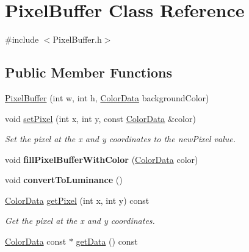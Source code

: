 \hypertarget{classPixelBuffer}{}\section{Pixel\+Buffer Class Reference}
\label{classPixelBuffer}


{\ttfamily \#include $<$Pixel\+Buffer.\+h$>$}

\subsection*{Public Member Functions}
\begin{DoxyCompactItemize}
\item 
\hyperlink{classPixelBuffer_ae373904fcdd3c820677b959354b75410}{Pixel\+Buffer} (int w, int h, \hyperlink{classColorData}{Color\+Data} background\+Color)
\item 
void \hyperlink{classPixelBuffer_abe673364dfceec95783e1dfb00ec9bd1}{set\+Pixel} (int x, int y, const \hyperlink{classColorData}{Color\+Data} \&color)\hypertarget{classPixelBuffer_abe673364dfceec95783e1dfb00ec9bd1}{}\label{classPixelBuffer_abe673364dfceec95783e1dfb00ec9bd1}

\begin{DoxyCompactList}\small\item\em Set the pixel at the x and y coordinates to the new\+Pixel value. \end{DoxyCompactList}\item 
void {\bfseries fill\+Pixel\+Buffer\+With\+Color} (\hyperlink{classColorData}{Color\+Data} color)\hypertarget{classPixelBuffer_a1bdab74553ab7d569629a42a808b4785}{}\label{classPixelBuffer_a1bdab74553ab7d569629a42a808b4785}

\item 
void {\bfseries convert\+To\+Luminance} ()\hypertarget{classPixelBuffer_a73f0518c147ad7900a64b4ffa205b9fc}{}\label{classPixelBuffer_a73f0518c147ad7900a64b4ffa205b9fc}

\item 
\hyperlink{classColorData}{Color\+Data} \hyperlink{classPixelBuffer_ae01450fb4e9824c1e93e92f4377e9924}{get\+Pixel} (int x, int y) const \hypertarget{classPixelBuffer_ae01450fb4e9824c1e93e92f4377e9924}{}\label{classPixelBuffer_ae01450fb4e9824c1e93e92f4377e9924}

\begin{DoxyCompactList}\small\item\em Get the pixel at the x and y coordinates. \end{DoxyCompactList}\item 
\hyperlink{classColorData}{Color\+Data} const $\ast$ \hyperlink{classPixelBuffer_a4b9ebe9181f451aa7c9858e400245e73}{get\+Data} () const \hypertarget{classPixelBuffer_a4b9ebe9181f451aa7c9858e400245e73}{}\label{classPixelBuffer_a4b9ebe9181f451aa7c9858e400245e73}


\end{DoxyCompactItemize}
